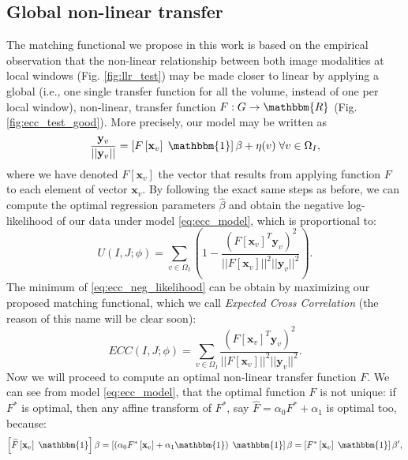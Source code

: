 \subsection{Global non-linear transfer}
The matching functional we propose in this work is based on the empirical observation that the non-linear relationship between both image modalities at local windows (Fig. \ref{fig:llr_test}) may be made closer to linear by applying a global (i.e., one single transfer function for all the volume, instead of one per local window), non-linear, transfer function $F: G \rightarrow \mathbbm{R}$ (Fig. \ref{fig:ecc_test_good}). More precisely, our model may be written as
\begin{equation}\label{eq:ecc_model}
    \frac{\mathbf{y}_{v}}{||\mathbf{y}_{v}||} = \left[F\left[\mathbf{x}_{v}\right] \; \mathbbm{1}\right]\beta + \eta(v) \; \forall v\in\Omega_{I},
\end{equation}
where we have denoted $F[\mathbf{x}_{v}]$ the vector that results from applying function $F$ to each element of vector $\mathbf{x}_{v}$. By following the exact same steps as before, we can compute the optimal regression parameters $\widehat{\beta}$ and obtain the negative log-likelihood of our data under model \eqref{eq:ecc_model}, which is proportional to:
\begin{equation}\label{eq:ecc_neg_likelihood}
    U(I, J;\phi) = \sum_{v\in\Omega_{I}}\left(1-\frac{\left(F\left[\mathbf{x}_{v}\right]^{T} \mathbf{y}_{v}\right)^{2}}{||F\left[\mathbf{x}_{v}\right]||^{2}||\mathbf{y}_{v}||^{2}}\right).
\end{equation}
The minimum of \eqref{eq:ecc_neg_likelihood} can be obtain by maximizing our proposed matching functional, which we call \emph{Expected Cross Correlation} (the reason of this name will be clear soon):
\begin{equation}\label{eq:ecc_functional}
    ECC(I, J;\phi) = \sum_{v\in\Omega_{I}}\frac{\left(F\left[\mathbf{x}_{v}\right]^{T} \mathbf{y}_{v}\right)^{2}}{||F\left[\mathbf{x}_{v}\right]||^{2}||\mathbf{y}_{v}||^{2}}.
\end{equation}
Now we will proceed to compute an optimal non-linear transfer function $F$. We can see from model \eqref{eq:ecc_model}, that the optimal function $F$ is not unique: if $F^{*}$ is optimal, then any affine transform of $F^{*}$, say $\widehat{F} = \alpha_{0} F^{*} + \alpha_{1}$ is optimal too, because:
\begin{displaymath}
    \left[\widehat{F}\left[\mathbf{x}_{v}\right] \; \mathbbm{1}\right]\beta =
    \left[\left(\alpha_{0}F^{*}\left[\mathbf{x}_{v}\right]+\alpha_{1}\mathbbm{1}\right) \; \mathbbm{1}\right]\beta =
    \left[F^{*}\left[\mathbf{x}_{v}\right] \; \mathbbm{1}\right]\beta',
\end{displaymath}
